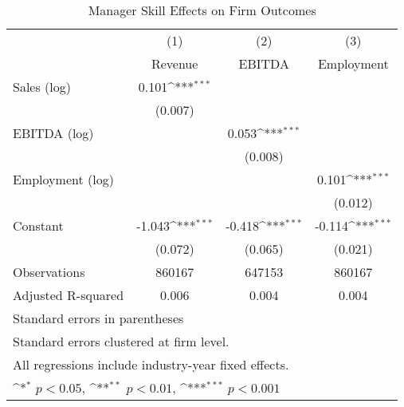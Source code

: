 \begin{table}[htbp]\centering
\def\sym#1{\ifmmode^{#1}\else\(^{#1}\)\fi}
\caption{Manager Skill Effects on Firm Outcomes}
\begin{tabular}{l*{3}{c}}
\toprule
                    &\multicolumn{1}{c}{(1)}&\multicolumn{1}{c}{(2)}&\multicolumn{1}{c}{(3)}\\
                    &\multicolumn{1}{c}{Revenue}&\multicolumn{1}{c}{EBITDA}&\multicolumn{1}{c}{Employment}\\
\midrule
Sales (log)         &       0.101\sym{***}&                     &                     \\
                    &     (0.007)         &                     &                     \\
\addlinespace
EBITDA (log)        &                     &       0.053\sym{***}&                     \\
                    &                     &     (0.008)         &                     \\
\addlinespace
Employment (log)    &                     &                     &       0.101\sym{***}\\
                    &                     &                     &     (0.012)         \\
\addlinespace
Constant            &      -1.043\sym{***}&      -0.418\sym{***}&      -0.114\sym{***}\\
                    &     (0.072)         &     (0.065)         &     (0.021)         \\
\midrule
Observations        &      860167         &      647153         &      860167         \\
Adjusted R-squared  &       0.006         &       0.004         &       0.004         \\
\bottomrule
\multicolumn{4}{l}{\footnotesize Standard errors in parentheses}\\
\multicolumn{4}{l}{\footnotesize Standard errors clustered at firm level.}\\
\multicolumn{4}{l}{\footnotesize All regressions include industry-year fixed effects.}\\
\multicolumn{4}{l}{\footnotesize \sym{*} \(p<0.05\), \sym{**} \(p<0.01\), \sym{***} \(p<0.001\)}\\
\end{tabular}
\end{table}

